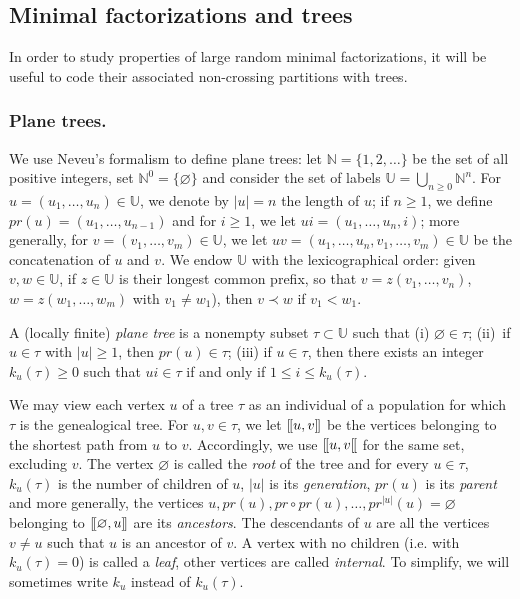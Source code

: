 \documentclass[10pt]{amsart}
\theoremstyle{definition}\newtheorem{defi}[theo]{Definition}\newtheorem{rema}[theo]{Remark}\newtheorem{exam}[theo]{Example}\newtheorem{exem}[theo]{Example}\newtheorem{nota}[theo]{Notation}
\def\U{\mathbb{U}}
\def\N{\mathbb{N}}
\def\llbracket{[\hspace{-.10em} [ }
\def\rrbracket{ ] \hspace{-.10em}]}
\begin{document}
\subsection{Minimal factorizations and trees}
\label{sec:trees}

In order to study properties of large random minimal factorizations, it will be useful to code their associated non-crossing partitions with trees.

\subsubsection{Plane trees.} We use Neveu's formalism \cite{Nev86} to define plane trees: let $\N = \{1, 2, \dots\}$ be the set of all positive integers, set $\N^0 = \{\varnothing\}$ and consider the set of labels $\U = \bigcup_{n \ge 0} \N^n$. For $u = (u_1, \dots, u_n) \in \U$, we denote by $|u| = n$ the length of $u$; if $n \ge 1$, we define $pr(u) = (u_1, \dots, u_{n-1})$ and for $i \ge 1$, we let $ui = (u_1, \dots, u_n, i)$; more generally, for $v = (v_1, \dots, v_m) \in \U$, we let $uv = (u_1, \dots, u_n, v_1, \dots, v_m) \in \U$ be the concatenation of $u$ and $v$. We endow $\U$ with the lexicographical order: given $v,w \in \U$, if $z \in \U$ is their longest common prefix, so that $v = z(v_1, \dots, v_n)$, $w = z(w_1, \dots, w_m)$ with $v_1 \ne w_1$), then $v \prec w$ if $v_1 < w_1$.

A (locally finite) \emph{plane tree} is a nonempty  subset $\tau \subset \U$ such that (i) $\varnothing \in \tau$; (ii)~if $u \in \tau$ with $|u| \ge 1$, then $pr(u) \in \tau$; (iii)  if $u \in \tau$, then there exists an integer $k_u(\tau) \ge 0$ such that $ui \in \tau$ if and only if $1 \le i \le k_u(\tau)$.

We may view each vertex $u$ of a tree $\tau$ as an individual of a population for which $\tau$ is the genealogical tree. For $u,v \in \tau$, we let  $\llbracket u, v \rrbracket$ be the vertices belonging to the shortest path from $u$ to $v$.
Accordingly, we use $\llbracket u, v \llbracket$ for the same set, excluding $v$.
The vertex $\varnothing$ is called the \emph{root} of the tree and for every $u \in \tau$, $k_u(\tau)$ is the number of children of $u$, $|u|$ is its \emph{generation}, $pr(u)$ is its \emph{parent} and more generally, the vertices $u, pr(u), pr \circ pr (u), \dots, pr^{|u|}(u) = \varnothing$ belonging to $ \llbracket \varnothing, u \rrbracket$ are its \emph{ancestors}.
The descendants of $u$ are all the vertices $v \neq u$ such that $u$ is an ancestor of $v$.
A vertex with no children (i.e. with $k_u(\tau) = 0$)
is called a \emph{leaf}, other vertices are called \emph{internal}.
To simplify, we will sometimes write $k_{u}$ instead of $k_{u}(\tau)$.
\end{document}
